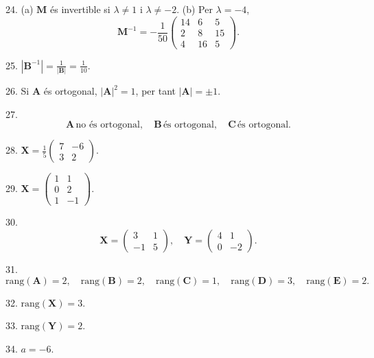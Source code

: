\documentclass[12pt]{article}
\newcommand{\mat}[1]{\mathbf{#1}}
\begin{document}
\begin{exercici}
24. 
(a) $\mat{M}$ és invertible si $\lambda \neq 1$ i $\lambda \neq -2$.  
(b) Per $\lambda = -4$, 
\[
\mat{M}^{-1} = 
-\frac{1}{50}
\begin{pmatrix}
14 & 6 & 5 \\
2 & 8 & 15 \\
4 & 16 & 5
\end{pmatrix}.
\]
\end{exercici}

\begin{exercici}
25. $|\mat{B}^{-1}| = \frac{1}{|\mat{B}|} = \frac{1}{10}$.
\end{exercici}

\begin{exercici}
26. Si $\mat{A}$ és ortogonal, $|\mat{A}|^2 = 1$, per tant $|\mat{A}| = \pm 1$.
\end{exercici}

\begin{exercici}
27. 
\[
\mat{A} \, \text{no és ortogonal}, \quad 
\mat{B} \, \text{és ortogonal}, \quad 
\mat{C} \, \text{és ortogonal}.
\]
\end{exercici}

\begin{exercici}
28. $\mat{X} = \frac{1}{5} 
\begin{pmatrix}
7 & -6 \\
3 & 2
\end{pmatrix}$.
\end{exercici}

\begin{exercici}
29. $\mat{X} = 
\begin{pmatrix}
1 & 1 \\
0 & 2 \\
1 & -1
\end{pmatrix}$.
\end{exercici}

\begin{exercici}
30. 
\[
\mat{X} = 
\begin{pmatrix}
3 & 1 \\
-1 & 5
\end{pmatrix}, \quad 
\mat{Y} = 
\begin{pmatrix}
4 & 1 \\
0 & -2
\end{pmatrix}.
\]
\end{exercici}

\begin{exercici}
31. 
\[
\text{rang}(\mat{A}) = 2, \quad \text{rang}(\mat{B}) = 2, \quad \text{rang}(\mat{C}) = 1, \quad \text{rang}(\mat{D}) = 3, \quad \text{rang}(\mat{E}) = 2.
\]
\end{exercici}

\begin{exercici}
32. $\text{rang}(\mat{X}) = 3$.
\end{exercici}

\begin{exercici}
33. $\text{rang}(\mat{Y}) = 2$.
\end{exercici}

\begin{exercici}
34. $a = -6$.
\end{exercici}
\end{document}
